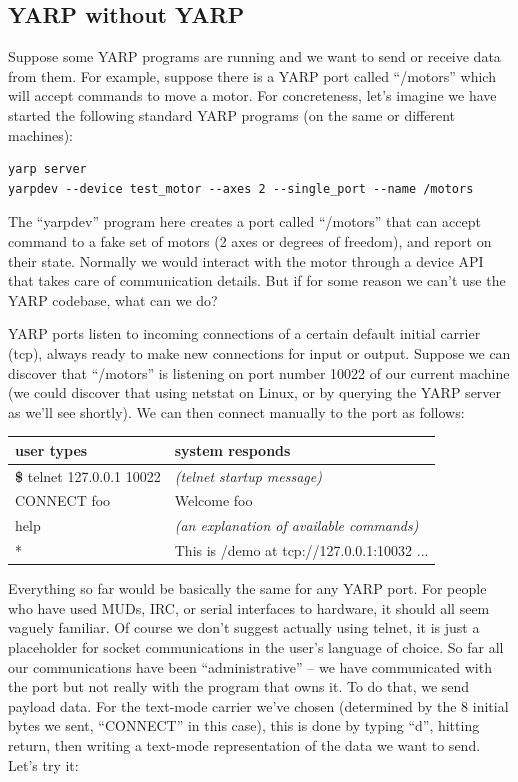 \subsection{YARP without YARP}

Suppose some YARP programs are running and we want to send or
receive data from them.
%
For example, suppose there is a YARP 
port called ``/motors'' which will accept commands to move a
motor.  For concreteness, let's imagine we have started the
following standard YARP programs (on the same or different 
machines):

\begin{verbatim}
yarp server
yarpdev --device test_motor --axes 2 --single_port --name /motors
\end{verbatim}

The ``yarpdev'' program here creates a port called ``/motors'' that can
accept command to a fake set of motors (2 axes or degrees of freedom),
and report on their state.
%
Normally we would interact with the motor through a device API
that takes care of communication details.  But if for 
some reason we can't use the YARP codebase, what can
we do?

YARP ports listen to incoming connections of
a certain default initial carrier (tcp), always ready to make
new connections for input or output.  Suppose we can discover that
``/motors'' is listening on port number 10022 of our current machine (we could
discover that using netstat on Linux, or by querying the YARP server
as we'll see shortly).
%
We can then connect manually to the port as follows:

\begin{center}
\begin{tabular}{ll}
\hline\hline
{\bf user types} & {\bf system responds} \\
\hline
{\bf \$} telnet 127.0.0.1 10022 & {\it (telnet startup message)} \\
CONNECT foo & Welcome foo \\
help & {\it (an explanation of available commands)} \\
* & This is /demo at tcp://127.0.0.1:10032 ... \\
\hline\hline
\end{tabular}
\end{center}

Everything so far would be basically the same for any YARP port.
For people who have used MUDs, IRC, or serial interfaces to hardware,
it should all seem vaguely familiar.
%
Of course we don't suggest actually using telnet, it is just
a placeholder for socket communications in the user's language
of choice.
%
So far all our communications have been ``administrative'' --
we have communicated with the port but not really with the 
program that owns it.  To do that, we send payload data.  For the
text-mode carrier we've chosen (determined by the 8 initial
bytes we sent, ``CONNECT\textvisiblespace'' in this case), 
this is done by typing
``d'', hitting return, then writing a text-mode representation of
the data we want to send.  Let's try it:

